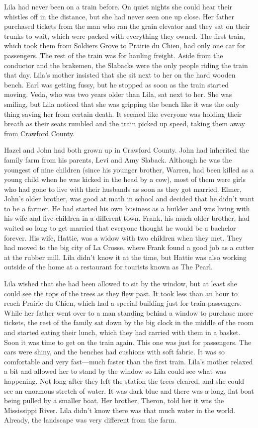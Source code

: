 \documentclass[
  letterpaper,
]{book}
\begin{document}
Lila had never been on a train before. On quiet nights she could hear
their whistles off in the distance, but she had never seen one up close.
Her father purchased tickets from the man who ran the grain elevator and
they sat on their trunks to wait, which were packed with everything they
owned. The first train, which took them from Soldiers Grove to Prairie
du Chien, had only one car for passengers. The rest of the train was for
hauling freight. Aside from the conductor and the brakemen, the Slabacks
were the only people riding the train that day. Lila's mother insisted
that she sit next to her on the hard wooden bench. Earl was getting
fussy, but he stopped as soon as the train started moving. Veda, who was
two years older than Lila, sat next to her. She was smiling, but Lila
noticed that she was gripping the bench like it was the only thing
saving her from certain death. It seemed like everyone was holding their
breath as their seats rumbled and the train picked up speed, taking them
away from Crawford County.

Hazel and John had both grown up in Crawford County. John had inherited
the family farm from his parents, Levi and Amy Slaback. Although he was
the youngest of nine children (since his younger brother, Warren, had
been killed as a young child when he was kicked in the head by a cow),
most of them were girls who had gone to live with their husbands as soon
as they got married. Elmer, John's older brother, was good at math in
school and decided that he didn't want to be a farmer. He had started
his own business as a builder and was living with his wife and five
children in a different town. Frank, his much older brother, had waited
so long to get married that everyone thought he would be a bachelor
forever. His wife, Hattie, was a widow with two children when they met.
They had moved to the big city of La Crosse, where Frank found a good
job as a cutter at the rubber mill. Lila didn't know it at the time, but
Hattie was also working outside of the home at a restaurant for tourists
known as The Pearl.

Lila wished that she had been allowed to sit by the window, but at least
she could see the tops of the trees as they flew past. It took less than
an hour to reach Prairie du Chien, which had a special building just for
train passengers. While her father went over to a man standing behind a
window to purchase more tickets, the rest of the family sat down by the
big clock in the middle of the room and started eating their lunch,
which they had carried with them in a basket. Soon it was time to get on
the train again. This one was just for passengers. The cars were shiny,
and the benches had cushions with soft fabric. It was so comfortable and
very fast---much faster than the first train. Lila's mother relaxed a
bit and allowed her to stand by the window so Lila could see what was
happening. Not long after they left the station the trees cleared, and
she could see an enormous stretch of water. It was dark blue and there
was a long, flat boat being pulled by a smaller boat. Her brother,
Theron, told her it was the Mississippi River. Lila didn't know there
was that much water in the world. Already, the landscape was very
different from the farm.
\end{document}
